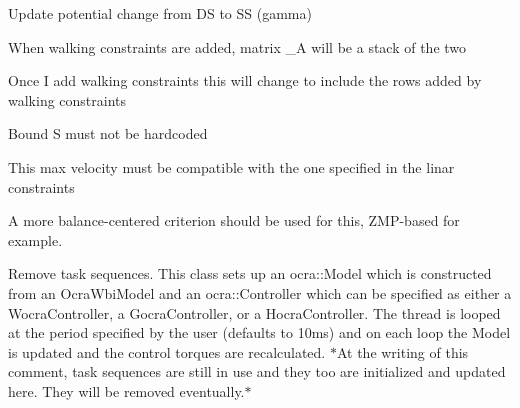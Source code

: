 \begin{DoxyRefList}
\-Update potential change from \-D\-S to \-S\-S (gamma)  
\item[\label{todo__todo000005}%
\hypertarget{todo__todo000005}{}%
\-Member \hyperlink{classMIQPLinearConstraints_a2f41d99a16293718b94d17ce9ee5b59d}{\-M\-I\-Q\-P\-Linear\-Constraints\-:\-:build\-Shape\-And\-Admissibility\-In\-Preview\-Window} ()]\-When walking constraints are added, matrix \-\_\-\-A will be a stack of the two  
\item[\label{todo__todo000004}%
\hypertarget{todo__todo000004}{}%
\-Member \hyperlink{classMIQPLinearConstraints_aaa55e8fc7fac6499f60c40e13b0d6605}{\-M\-I\-Q\-P\-Linear\-Constraints\-:\-:\-M\-I\-Q\-P\-Linear\-Constraints} (std\-::shared\-\_\-ptr$<$ Step\-Controller $>$ step\-Controller, \hyperlink{structMIQPParameters}{\-M\-I\-Q\-P\-Parameters} miqp\-Params, bool add\-Shape\-Ctrs=true, bool add\-Admissibility\-Ctrs=true, bool add\-Co\-P\-Constraints=false, bool add\-Walking\-Ctrs=false)]\-Once \-I add walking constraints this will change to include the rows added by walking constraints  
\item[\label{todo__todo000006}%
\hypertarget{todo__todo000006}{}%
\-Member \hyperlink{classSingleSupport_a78e5b7c89b828d718560cec73c0f6218}{\-Single\-Support\-:\-:build\-Matrix\-Ci} ()]\-Bound \-S must not be hardcoded  
\item[\label{todo__todo000010}%
\hypertarget{todo__todo000010}{}%
\-Member \hyperlink{classStepController_a8f061f201c651d920ca02f7daa07adfe}{\-Step\-Controller\-:\-:initialize} ()]\-This max velocity must be compatible with the one specified in the linar constraints  
\item[\label{todo__todo000002}%
\hypertarget{todo__todo000002}{}%
\-Member \hyperlink{classSteppingDemoClient_ad8fbc186267a47a73bb77e78199f2b8c}{\-Stepping\-Demo\-Client\-:\-:is\-Balanced} ()]\-A more balance-\/centered criterion should be used for this, \-Z\-M\-P-\/based for example.  
\item[\label{todo__todo000001}%
\hypertarget{todo__todo000001}{}%
\-Class \hyperlink{classThread}{\-Thread} ]\-Remove task sequences. \-This class sets up an ocra\-::\-Model which is constructed from an \-Ocra\-Wbi\-Model and an ocra\-::\-Controller which can be specified as either a \-Wocra\-Controller, a \-Gocra\-Controller, or a \-Hocra\-Controller. \-The thread is looped at the period specified by the user (defaults to 10ms) and on each loop the \-Model is updated and the control torques are recalculated. $\ast$\-At the writing of this comment, task sequences are still in use and they too are initialized and updated here. \-They will be removed eventually.$\ast$  

\end{DoxyRefList}
